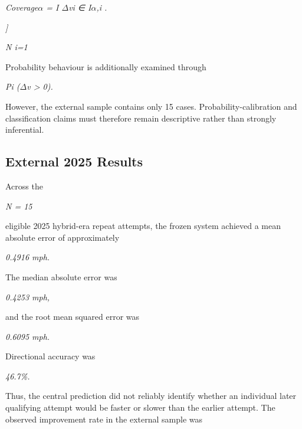 \begin{center}\textit{Coverage\ensuremath{\alpha} =          I \ensuremath{\Delta}vi ∈ I\ensuremath{\alpha},i .}\end{center}

\begin{center}\textit{]}\end{center}

\begin{center}\textit{N i=1}\end{center}

Probability behaviour is additionally examined through

\begin{center}\textit{Pi (\ensuremath{\Delta}v > 0).}\end{center}

However, the external sample contains only 15 cases. Probability-calibration and classification claims must therefore remain descriptive rather than strongly inferential.

\subsection{External 2025 Results}
Across the

\begin{center}\textit{N = 15}\end{center}

eligible 2025 hybrid-era repeat attempts, the frozen system achieved a mean absolute error of approximately

\begin{center}\textit{0.4916 mph.}\end{center}

The median absolute error was

\begin{center}\textit{0.4253 mph,}\end{center}

and the root mean squared error was

\begin{center}\textit{0.6095 mph.}\end{center}

Directional accuracy was

\begin{center}\textit{46.7\%.}\end{center}

Thus, the central prediction did not reliably identify whether an individual later qualifying attempt would be faster or slower than the earlier attempt. The observed improvement rate in the external sample was

